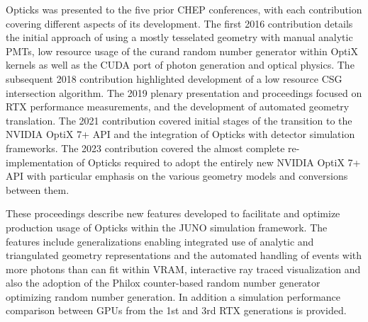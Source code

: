 \documentclass{webofc}
\newcommand{\comment}[1]{}
\begin{document}
Opticks was presented to the five prior CHEP conferences, with each contribution
covering different aspects of its development. 
The first 2016 contribution\cite{chep2016} details the initial approach of using a mostly tesselated 
geometry with manual analytic PMTs, low resource usage of the curand random number 
generator within OptiX kernels as well as the CUDA port of photon generation and optical physics. 
The subsequent 2018 contribution\cite{chep2018} highlighted development of a low resource CSG intersection algorithm. 
The 2019 plenary presentation and proceedings\cite{chep2019} focused on RTX\cite{rtx} performance measurements, 
and the development of automated geometry translation.  
The 2021 contribution\cite{chep2021} covered initial stages of the transition to the NVIDIA OptiX 7+ API 
and the integration of Opticks with detector simulation frameworks. The 2023 contribution\cite{chep2023}
covered the almost complete re-implementation of Opticks required to adopt the entirely new NVIDIA OptiX 7+ API
with particular emphasis on the various geometry models and conversions between them.  
%

These proceedings describe new features developed to facilitate and optimize production usage of Opticks 
within the JUNO simulation framework. The features include generalizations enabling 
integrated use of analytic and triangulated geometry representations and the automated handling of 
events with more photons than can fit within VRAM, interactive ray traced visualization and also the adoption
of the Philox counter-based random number generator optimizing random number generation.
In addition a simulation performance comparison between GPUs from the 1st and 3rd RTX generations
is provided. 
%
%
\comment{
\subsection{Importance of optical photon simulation}%
%
%
Suppression of cosmic muon induced backgrounds with veto selections are crucial for neutrino
detectors such as JUNO\cite{juno}, necessitating production of large simulated samples of muon events. 
However, a muon of typical energy 200 GeV crossing the JUNO scintillator can yield tens of millions of 
optical photons, which are found with Geant4 simulations to consume more than 99\% of CPU time
and impose severe memory constraints.
%
As optical photons in neutrino detectors can be considered to be produced
only by scintillation and Cherenkov processes and yield only hits
on photomultiplier tubes, it is straightforward to combine an external optical photon simulation 
with a Geant4 simulation of all other particles.
}%
%
\end{document}
